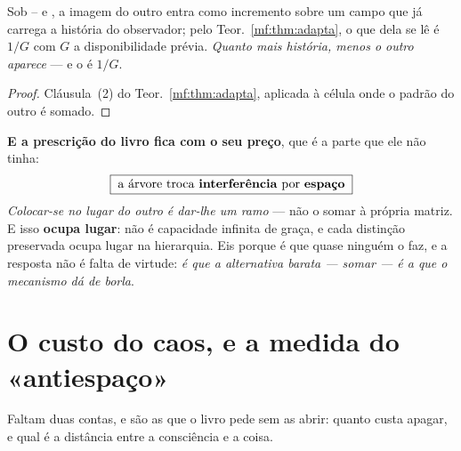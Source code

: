 \documentclass[../livro.tex]{subfiles}
\begin{document}
\begin{corolario}\label{mf:cor:outroeu}
Sob -- e , a imagem do outro entra como incremento sobre um
campo que já carrega a história do observador; pelo Teor.~\ref{mf:thm:adapta}, o
que dela se lê é $1/G$ com $G$ a disponibilidade prévia. \emph{Quanto mais
história, menos o outro aparece} --- e o  é $1/G$.
\end{corolario}

\begin{proof}
Cláusula~(2) do Teor.~\ref{mf:thm:adapta}, aplicada à célula onde o padrão do
outro é somado.
\end{proof}

\medskip\noindent\textbf{E a prescrição do livro fica com o seu preço}, que é a
parte que ele não tinha:
\[
\boxed{\;\text{a árvore troca \textbf{interferência} por \textbf{espaço}}\;}
\]
\emph{Colocar-se no lugar do outro é dar-lhe um ramo} --- não o somar à própria
matriz. E isso \textbf{ocupa lugar}: não é capacidade infinita de graça, e cada
distinção preservada ocupa lugar na hierarquia. Eis porque é que quase ninguém o
faz, e a resposta não é falta de virtude: \emph{é que a alternativa barata ---
somar --- é a que o mecanismo dá de borla}.


\section{O custo do caos, e a medida do «antiespaço»}\label{mf:custo}

\noindent Faltam duas contas, e são as que o livro pede sem as abrir: quanto
custa apagar, e qual é a distância entre a consciência e a coisa.
\end{document}
